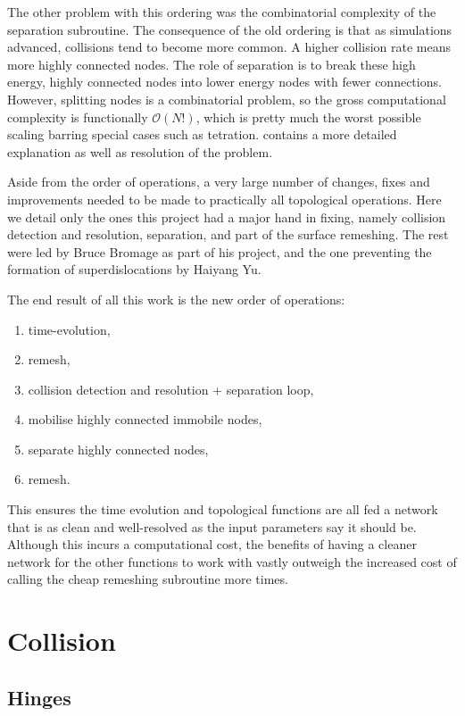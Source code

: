 The other problem with this ordering was the combinatorial complexity of the separation subroutine. The consequence of the old ordering is that as simulations advanced, collisions tend to become more common. A higher collision rate means more highly connected nodes. The role of separation is to break these high energy, highly connected nodes into lower energy nodes with fewer connections. However, splitting nodes is a combinatorial problem, so the gross computational complexity is functionally $\mathcal{O}(N!)$, which is pretty much the worst possible scaling barring special cases such as tetration.  contains a more detailed explanation as well as resolution of the problem.

Aside from the order of operations, a very large number of changes, fixes and improvements needed to be made to practically all topological operations. Here we detail only the ones this project had a major hand in fixing, namely collision detection and resolution, separation, and part of the surface remeshing. The rest were led by Bruce Bromage as part of his project, and the one preventing the formation of superdislocations by Haiyang Yu.

The end result of all this work is the new order of operations:
\begin{enumerate}
    \item time-evolution,
    \item remesh,
    \item collision detection and resolution + separation loop,
    \item mobilise highly connected immobile nodes,
    \item separate highly connected nodes,
    \item remesh.
\end{enumerate}
This ensures the time evolution and topological functions are all fed a network that is as clean and well-resolved as the input parameters say it should be. Although this incurs a computational cost, the benefits of having a cleaner network for the other functions to work with vastly outweigh the increased cost of calling the cheap remeshing subroutine more times.

\section{Collision}\label{s:collision}

\subsection{Hinges}\label{ss:hinges}

